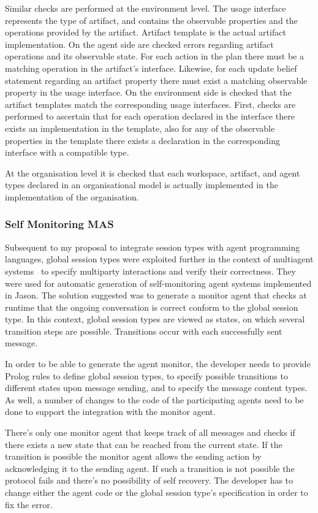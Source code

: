 \documentclass[a4paper,12pt,oneside,fleqn]{book} %
\begin{document}
Similar checks are performed at the environment level. The usage interface
represents the type of artifact, and contains the observable properties and
the operations provided by the artifact. Artifact template is the actual
artifact implementation. On the agent side are checked errors regarding
artifact operations and its observable state. For each action in the plan
there must be a matching operation in the artifact's interface.  Likewise,
for each update belief statement regarding an artifact property there must
exist a matching observable property in the usage interface. On the
environment side is checked that the artifact templates match the
corresponding usage interfaces. First, checks are performed to ascertain
that for each operation declared in the interface there exists an
implementation in the template, also for any of the observable properties
in the template there exists a declaration in the corresponding interface
with a compatible type.

At the organisation level it is checked that each workspace, artifact, and
agent types declared in an organisational model is actually implemented in
the implementation of the organisation.

\subsubsection{Self Monitoring MAS} %
Subsequent to my proposal to integrate session types with agent programming
languages, global session types were exploited further in the context of
multiagent systems~\cite{DBLP:conf/dalt/AnconaDM12} to specify multiparty
interactions and verify their correctness. They were used for automatic
generation of self-monitoring agent systems implemented in Jason. The
solution suggested was to generate a monitor agent that checks at runtime
that the ongoing conversation is correct conform to the global session
type. In this context, global session types are viewed as states, on which
several transition steps are possible. Transitions occur with each
successfully sent message.

In order to be able to generate the agent monitor, the developer needs to
provide Prolog rules to define global session types, to specify possible
transitions to different states upon message sending, and to specify the
message content types. As well, a number of changes to the code of the
participating agents need to be done to support the integration with the
monitor agent.

There's only one monitor agent that keeps track of all messages and checks
if there exists a new state that can be reached from the current state. If
the transition is possible the monitor agent allows the sending action by
acknowledging it to the sending agent. If such a transition is not
possible the protocol fails and there's no possibility of self recovery.
The developer has to change either the agent code or the global session
type's specification in order to fix the error.
\end{document}
